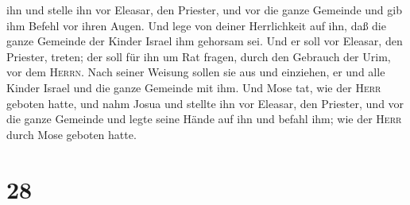 ihn und stelle ihn vor Eleasar, den Priester, und vor die ganze Gemeinde
und gib ihm Befehl vor ihren Augen.  Und lege von deiner
Herrlichkeit auf ihn, daß die ganze Gemeinde der Kinder Israel ihm
gehorsam sei.  Und er soll vor Eleasar, den Priester,
treten; der soll für ihn um Rat fragen, durch den Gebrauch der Urim, vor
dem \textsc{Herrn}. Nach seiner Weisung sollen sie aus und einziehen, er
und alle Kinder Israel und die ganze Gemeinde mit ihm. 
Und Mose tat, wie der \textsc{Herr} geboten hatte, und nahm Josua und
stellte ihn vor Eleasar, den Priester,  und vor die ganze
Gemeinde und legte seine Hände auf ihn und befahl ihm; wie der
\textsc{Herr} durch Mose geboten hatte.

\hypertarget{section-27}{%
\section{28}\label{section-27}}

